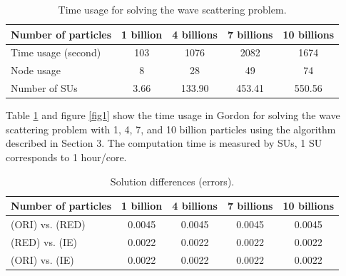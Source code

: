 \documentclass{wap}
\begin{document}
\begin{table}[htbp]
  \centering
  \caption{Time usage for solving the wave scattering problem.}
    \begin{tabular}{lcccc}
    \toprule
    Number of particles & 1 billion & 4 billions & 7 billions & 10 billions \\
    \midrule
    Time usage (second) & 103   & 1076  & 2082  & 1674 \\
    Node usage & 8     & 28    & 49    & 74 \\
    Number of SUs & 3.66 & 133.90 & 453.41 & 550.56 \\
    \bottomrule
    \end{tabular}%
  \label{tab3}%
\end{table}%

Table \ref{tab3} and figure \ref{fig1} show the time usage in Gordon for solving the wave scattering problem with 1, 4, 7, and 10 billion particles using the algorithm described in Section 3. The computation time is measured by SUs, 1 SU corresponds to 1 hour/core.

\begin{table}[htbp]
  \centering
  \caption{Solution differences (errors).}
    \begin{tabular}{lcccc}
    \toprule
    Number of particles & 1 billion & 4 billions & 7 billions & 10 billions \\
    \midrule
    (ORI) vs. (RED) & 0.0045 & 0.0045 & 0.0045 & 0.0045 \\
    (RED) vs. (IE) & 0.0022 & 0.0022 & 0.0022 & 0.0022 \\
    (ORI) vs. (IE) & 0.0022 & 0.0022 & 0.0022 & 0.0022 \\
    \bottomrule
    \end{tabular}%
  \label{tab4}%
\end{table}%
\end{document}
